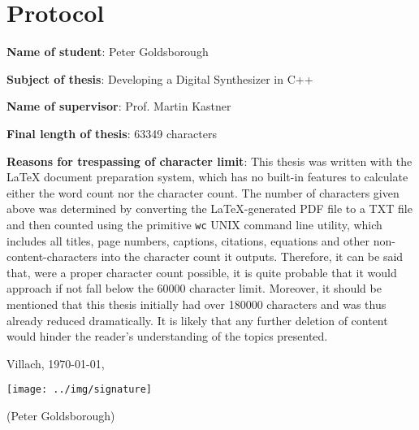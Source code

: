 \documentclass[12pt]{report}
\newcommand{\parbreak}{\vspace{\baselineskip}}
\begin{document}
\chapter*{Protocol}

\textbf{Name of student}: Peter Goldsborough \parbreak

\textbf{Subject of thesis}: Developing a Digital Synthesizer in C++ \parbreak

\textbf{Name of supervisor}: Prof. Martin Kastner \parbreak

\textbf{Final length of thesis}: 63349 characters \parbreak

\textbf{Reasons for trespassing of character limit}: This thesis was written with the \LaTeX{} document preparation system, which has no built-in features to calculate either the word count nor the character count. The number of characters given above was determined by converting the \LaTeX{}-generated PDF file to a TXT file and then counted using the primitive \texttt{wc} UNIX command line utility, which includes all titles, page numbers, captions, citations, equations and other non-content-characters into the character count it outputs. Therefore, it can be said that, were a proper character count possible, it is quite probable that it would approach if not fall below the 60000 character limit. Moreover, it should be mentioned that this thesis initially had over 180000 characters and was thus already reduced dramatically. It is likely that any further deletion of content would hinder the reader's understanding of the topics presented. \parbreak \parbreak \parbreak \parbreak

{ \centering

Villach, \today, \parbreak \parbreak \parbreak

\texttt{[image: ../img/signature]} \parbreak

(Peter Goldsborough) \parbreak \parbreak \parbreak

}

\pagebreak
\end{document}

